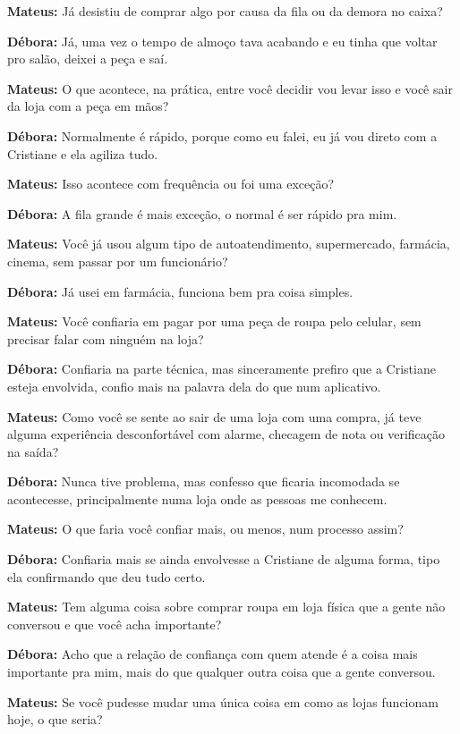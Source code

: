\textbf{Mateus:} Já desistiu de comprar algo por causa da fila ou da demora no caixa?

\textbf{Débora:} Já, uma vez o tempo de almoço tava acabando e eu tinha que voltar pro salão, deixei a peça e saí.

\textbf{Mateus:} O que acontece, na prática, entre você decidir vou levar isso e você sair da loja com a peça em mãos?

\textbf{Débora:} Normalmente é rápido, porque como eu falei, eu já vou direto com a Cristiane e ela agiliza tudo.

\textbf{Mateus:} Isso acontece com frequência ou foi uma exceção?

\textbf{Débora:} A fila grande é mais exceção, o normal é ser rápido pra mim.

\textbf{Mateus:} Você já usou algum tipo de autoatendimento, supermercado, farmácia, cinema, sem passar por um funcionário?

\textbf{Débora:} Já usei em farmácia, funciona bem pra coisa simples.

\textbf{Mateus:} Você confiaria em pagar por uma peça de roupa pelo celular, sem precisar falar com ninguém na loja?

\textbf{Débora:} Confiaria na parte técnica, mas sinceramente prefiro que a Cristiane esteja envolvida, confio mais na palavra dela do que num aplicativo.

\textbf{Mateus:} Como você se sente ao sair de uma loja com uma compra, já teve alguma experiência desconfortável com alarme, checagem de nota ou verificação na saída?

\textbf{Débora:} Nunca tive problema, mas confesso que ficaria incomodada se acontecesse, principalmente numa loja onde as pessoas me conhecem.

\textbf{Mateus:} O que faria você confiar mais, ou menos, num processo assim?

\textbf{Débora:} Confiaria mais se ainda envolvesse a Cristiane de alguma forma, tipo ela confirmando que deu tudo certo.

\textbf{Mateus:} Tem alguma coisa sobre comprar roupa em loja física que a gente não conversou e que você acha importante?

\textbf{Débora:} Acho que a relação de confiança com quem atende é a coisa mais importante pra mim, mais do que qualquer outra coisa que a gente conversou.

\textbf{Mateus:} Se você pudesse mudar uma única coisa em como as lojas funcionam hoje, o que seria?

